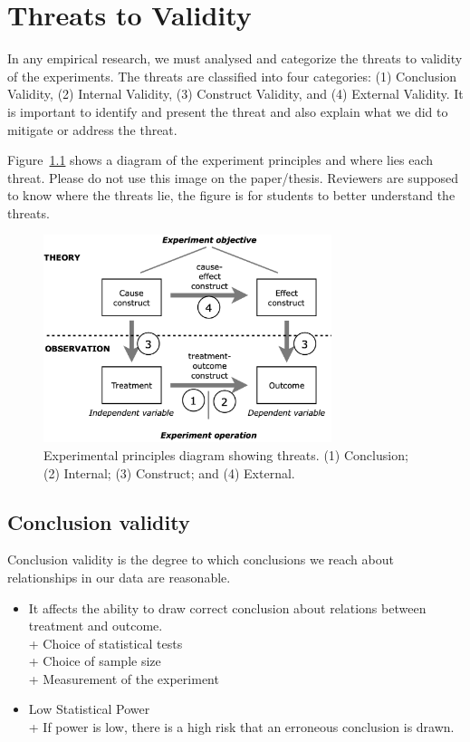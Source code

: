 
\chapter{Threats to Validity}\label{ch:threats}

In any empirical research, we must analysed and categorize the threats to validity of the experiments. 
The threats are classified into four categories: (1) Conclusion Validity, (2) Internal Validity, (3) Construct Validity, and (4) External Validity. 
It is important to identify and present the threat and also explain what we did to mitigate or address the threat.

Figure~\ref{fig:threats} shows a diagram of the experiment principles and where lies each threat.
Please do not use this image on the paper/thesis.
Reviewers are supposed to know where the threats lie, the figure is for students to better understand the threats.
\begin{figure}[h]
	\centering
	\includegraphics[width=0.75\textwidth]{images/threats-to-validity.png} 
	\caption{Experimental principles diagram showing threats. (1) Conclusion; (2) Internal; (3) Construct; and (4) External.}
	\label{fig:threats}
\end{figure}


\section{Conclusion validity}

Conclusion validity is the degree to which conclusions we reach about relationships in our data are reasonable.
\begin{itemize}
   \item  It affects the ability to draw correct conclusion about relations between treatment and outcome. \\
+ Choice of statistical tests \\
+ Choice of sample size \\
+ Measurement of the experiment
  \item Low Statistical Power \\
+ If power is low, there is a high risk that an erroneous conclusion is drawn.
\end{itemize}


